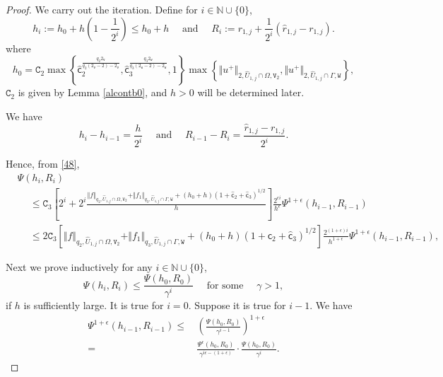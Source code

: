 \documentclass[reqno, 11pt, a4paper]{amsart}
\numberwithin{equation}{section}
\newcommand{\xv}{2_{\mathtt{V}}}
\newcommand{\xw}{2_{\mathtt{W}}}
\newcommand{\fc}{\mathsf c}
\newcommand{\wghtv}{\mathtt{V}}
\newcommand{\wghtw}{\mathtt{W}}
\newcommand{\qxp}{q}
\newcommand{\cen}{\mathtt{C}}
\begin{document}
\begin{proof}  

We carry out the iteration.  Define for $i\in \mathbb{N} \cup \{0\}$,
$$
 h_{i}:=h_0 + h \left(1-\frac{1}{2^{i}}\right) \leq  h_0 +h \quad \text { and } \quad  R_{i}:= r _{1,j} +\frac{1}{2^{i}} (\hat r _{1,j} -  r _{1,j}).
$$
where  
$$
h_0 = \cen _2 \max \left\{ \widehat{\fc}_2 ^{\frac{\qxp _2 \xv }{\qxp _2 (\xv -2) - \xv}}   , \widehat{\fc}_3 ^{\frac{\qxp _3 \xw }{\qxp _3 (\xw -2) - \xw}} , 1\right\} \max \left\{ \Vert u^+ \Vert _{2 , \hat U _{1,j} \cap \Omega  , \wghtv _2}  ,   \Vert  u^+ \Vert _{2 , \hat U _{1,j} \cap \Gamma , \wghtw }   \right\},
$$
$\cen _2$ is given by Lemma \ref{alcontb0}, and $h>0$ will be determined later.

We have
$$
h_{i}-h_{i-1}=\frac{h}{2^{i}}\quad \text { and } \quad R_{i-1}-R_{i}=\frac{\hat r _{1,j} -  r _{1,j}}{2^{i}} .
$$

Hence, from \eqref{48}, 
\begin{align}
&\Psi  (h_{i}, R _i) \nonumber \\[3pt]
&\quad \ \leq \cen _3 \left[    2^i  + 2^i\frac{\Vert f \Vert _{ q_2 ,  \hat U _{1,j} \cap \Omega  , \wghtv _2}  + \Vert f_1 \Vert _{q_3 , \hat U _{1,j} \cap \Gamma , \wghtw} + (h _0 + h )(1+\widehat{\fc}_2 + \widehat{\fc}_3)^{1/2} }{h}\right]\frac{2^{\epsilon i}}{h^\epsilon} \Psi ^{1 + \epsilon  } (h_{i-1} , R_{i-1}) \nonumber \\[5pt]
&\quad \ \leq 2\cen _3 \left[ \Vert f \Vert _{ q_2 ,  \hat U _{1,j} \cap \Omega  , \wghtv _2}  + \Vert f_1 \Vert _{q_3 , \hat U _{1,j} \cap \Gamma , \wghtw} + (h _0 + h  )(1+\widehat{\fc}_2 + \widehat{\fc}_3)^{1/2}\right] \frac{2^{(1+\epsilon )i}}{h^{1+\epsilon}} \Psi ^{1 + \epsilon  } (h_{i-1} , R_{i-1}), \label{49}
\end{align}

Next we prove inductively for any $i\in \mathbb{N} \cup \{0\}$,
\begin{equation} \label{51}
\Psi  (h_{i} , R_{i}) \leq \frac{\Psi  (h_{0} , R_{0}) }{\gamma^{i}} \quad \text { for some } \quad \gamma>1,
\end{equation}
if $h$ is sufficiently large. It is true for $i=0$. Suppose it is true for $i-1$. We have
\begin{equation} \label{50}
\begin{aligned}
\Psi ^{1 + \epsilon  } (h_{i-1} , R_{i-1}) \leq & \, \displaystyle \left(  \frac{\Psi (h_0, R_0 )}{\gamma^{i-1}}\right) ^{1+\epsilon }\\[3pt]
=  & \, \displaystyle \frac{\Psi ^{\epsilon } (h_0, R_0)}{\gamma^{i \epsilon -(1+\epsilon )}} \cdot  \frac{\Psi (h_0, R_0)}{\gamma^{i}} .
\end{aligned}
\end{equation}


\end{proof}
\end{document}
